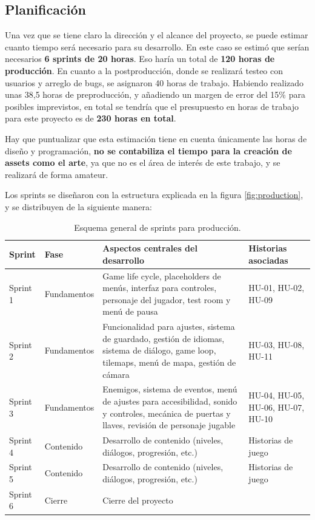 \subsection{Planificación}

Una vez que se tiene claro la dirección y el alcance del proyecto, se puede estimar cuanto tiempo será necesario para su desarrollo. En este caso se estimó que serían necesarios \textbf{6 sprints de 20 horas}. Eso haría un total de \textbf{120 horas de producción}. En cuanto a la postproducción, donde se realizará testeo con usuarios y arreglo de bugs, se asignaron 40 horas de trabajo. Habiendo realizado unas 38,5 horas de preproducción, y añadiendo un margen de error del 15\% para posibles imprevistos, en total se tendría que el presupuesto en horas de trabajo para este proyecto es de \textbf{230 horas en total}.

Hay que puntualizar que esta estimación tiene en cuenta únicamente las horas de diseño y programación, \textbf{no se contabiliza el tiempo para la creación de assets como el arte}, ya que no es el área de interés de este trabajo, y se realizará de forma amateur.

Los sprints se diseñaron con la estructura explicada en la figura \ref{fig:production}, y se distribuyen de la siguiente manera:

\begin{table}[htb]
    \centering
    \begin{tabular}{|l|l|p{8cm}|p{}|}
    \hline
        Sprint & Fase & Aspectos centrales del desarrollo & Historias asociadas \\ \hline
        Sprint 1 & Fundamentos & Game life cycle, placeholders de menús, interfaz para controles, personaje del jugador, test room y menú de pausa & HU-01, HU-02, HU-09 \\ \hline
        Sprint 2 & Fundamentos & Funcionalidad para ajustes, sistema de guardado, gestión de idiomas, sistema de diálogo, game loop, tilemaps, menú de mapa, gestión de cámara & HU-03, HU-08, HU-11 \\ \hline
        Sprint 3 & Fundamentos & Enemigos, sistema de eventos, menú de ajustes para accesibilidad, sonido y controles, mecánica de puertas y llaves, revisión de personaje jugable & HU-04, HU-05, HU-06, HU-07, HU-10 \\ \hline
        Sprint 4 & Contenido & Desarrollo de contenido (niveles, diálogos, progresión, etc.) & Historias de juego \\ \hline
        Sprint 5 & Contenido & Desarrollo de contenido (niveles, diálogos, progresión, etc.) & Historias de juego \\ \hline
        Sprint 6 & Cierre & Cierre del proyecto & ~ \\ \hline
    \end{tabular}
    \caption{Esquema general de sprints para producción.}
\end{table}

